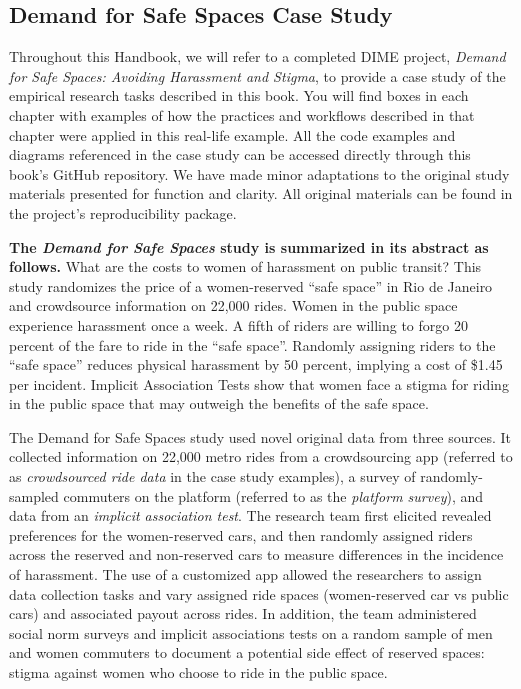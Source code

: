 \documentclass[
]{book}
\begin{document}
\begin{ex}
\hypertarget{demand-for-safe-spaces-case-study}{%
\subsection{Demand for Safe Spaces Case Study}\label{demand-for-safe-spaces-case-study}}

Throughout this Handbook, we will refer to a completed DIME project, \emph{Demand for Safe Spaces: Avoiding Harassment and Stigma}, to provide a case study of the empirical research tasks described in this book. You will find boxes in each chapter with examples of how the practices and workflows described in that chapter were applied in this real-life example. All the code examples and diagrams referenced in the case study can be accessed directly through this book's GitHub repository. We have made minor adaptations to the original study materials presented for function and clarity. All original materials can be found in the project's reproducibility package.

\textbf{The \emph{Demand for Safe Spaces} study is summarized in its abstract as follows.} What are the costs to women of harassment on public transit? This study randomizes the price of a women-reserved ``safe space'' in Rio de Janeiro and crowdsource information on 22,000 rides. Women in the public space experience harassment once a week. A fifth of riders are willing to forgo 20 percent of the fare to ride in the ``safe space''. Randomly assigning riders to the ``safe space'' reduces physical harassment by 50 percent, implying a cost of \$1.45 per incident. Implicit Association Tests show that women face a stigma for riding in the public space that may outweigh the benefits of the safe space.

The Demand for Safe Spaces study used novel original data from three sources. It collected information on 22,000 metro rides from a crowdsourcing app (referred to as \emph{crowdsourced ride data} in the case study examples), a survey of randomly-sampled commuters on the platform (referred to as the \emph{platform survey}), and data from an \emph{implicit association test}. The research team first elicited revealed preferences for the women-reserved cars, and then randomly assigned riders across the reserved and non-reserved cars to measure differences in the incidence of harassment. The use of a customized app allowed the researchers to assign data collection tasks and vary assigned ride spaces (women-reserved car vs public cars) and associated payout across rides. In addition, the team administered social norm surveys and implicit associations tests on a random sample of men and women commuters to document a potential side eﬀect of reserved spaces: stigma against women who choose to ride in the public space.


\end{ex}
\end{document}
